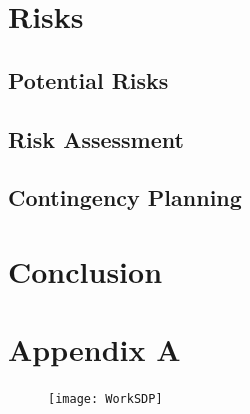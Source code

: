 \documentclass[a4paper,12pt]{article}
\begin{document}
\section{Risks}

\subsection{Potential Risks}


\subsection{Risk Assessment}


\subsection{Contingency Planning}


\section{Conclusion}
\newpage
\section*{Appendix A}
\begin{figure}[H]
    \centering
    \texttt{[image: WorkSDP]}
    \label{fig:workchart}
\end{figure}
\end{document}
